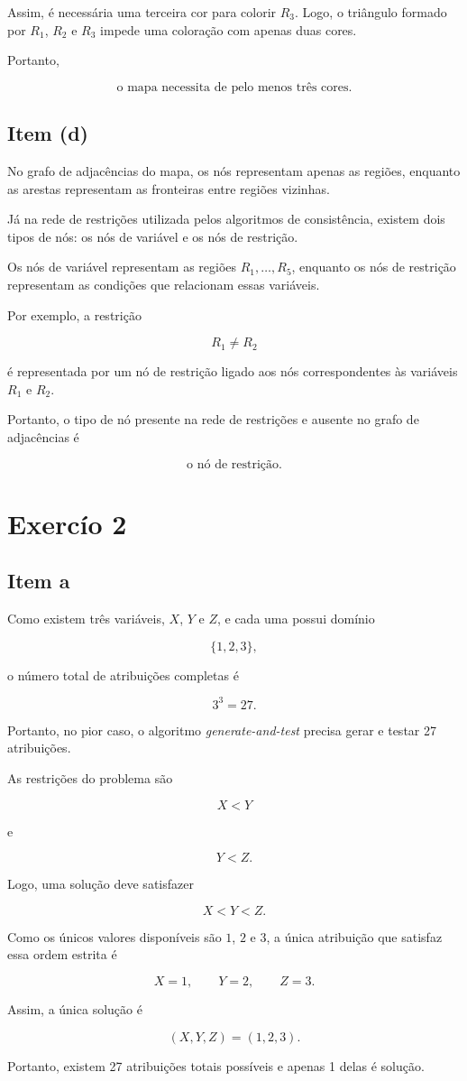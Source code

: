 Assim, é necessária uma terceira cor para colorir $R_3$. Logo, o
triângulo formado por $R_1$, $R_2$ e $R_3$ impede uma coloração com
apenas duas cores.

Portanto,

\[
\boxed{\text{o mapa necessita de pelo menos três cores.}}
\]

\subsection{Item (d)}

No grafo de adjacências do mapa, os nós representam apenas as regiões,
enquanto as arestas representam as fronteiras entre regiões vizinhas.

Já na rede de restrições utilizada pelos algoritmos de consistência,
existem dois tipos de nós: os nós de variável e os nós de restrição.

Os nós de variável representam as regiões $R_1,\ldots,R_5$, enquanto
os nós de restrição representam as condições que relacionam essas
variáveis.

Por exemplo, a restrição

\[
R_1 \neq R_2
\]

é representada por um nó de restrição ligado aos nós correspondentes
às variáveis $R_1$ e $R_2$.

Portanto, o tipo de nó presente na rede de restrições e ausente no
grafo de adjacências é

\[
\boxed{\text{o nó de restrição.}}
\]

\section{Exercío 2}
\subsection{Item a}

Como existem três variáveis, $X$, $Y$ e $Z$, e cada uma possui domínio

\[
\{1,2,3\},
\]

o número total de atribuições completas é

\[
3^3 = 27.
\]

Portanto, no pior caso, o algoritmo \textit{generate-and-test} precisa
gerar e testar 27 atribuições.

As restrições do problema são

\[
X < Y
\]

e

\[
Y < Z.
\]

Logo, uma solução deve satisfazer

\[
X < Y < Z.
\]

Como os únicos valores disponíveis são $1$, $2$ e $3$, a única
atribuição que satisfaz essa ordem estrita é

\[
X=1,\qquad Y=2,\qquad Z=3.
\]

Assim, a única solução é

\[
\boxed{(X,Y,Z)=(1,2,3)}.
\]

Portanto, existem 27 atribuições totais possíveis e apenas 1 delas é solução.
